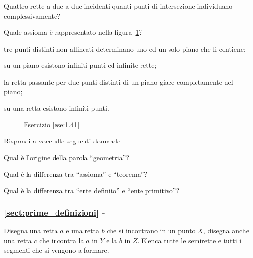 \begin{esercizio}
\label{ese:1.40}
Quattro rette a due a due incidenti quanti punti di intersezione 
individuano complessivamente?
\end{esercizio}

\begin{esercizio}
\label{ese:1.41}
Quale assioma è rappresentato nella figura~\ref{fig:ese1.41}?
\begin{enumeratea}
\item tre punti distinti non allineati determinano uno ed un solo 
piano che li contiene;
\item su un piano esistono infiniti punti ed infinite rette;
\item la retta passante per due punti distinti di un piano giace 
completamente nel piano;
\item su una retta esistono infiniti punti.
\end{enumeratea}
\end{esercizio}


\begin{inaccessibleblock}
 \begin{figure}[htb]
 \centering
 \caption{Esercizio \ref{ese:1.41}}\label{fig:ese1.41}
\end{figure}
\end{inaccessibleblock}

\begin{esercizio}
\label{ese:1.42}
Rispondi a voce alle seguenti domande
\begin{enumeratea}
\item Qual è l'origine della parola ``geometria''?
\item Qual è la differenza tra ``assioma'' e ``teorema''?
\item Qual è la differenza tra ``ente definito'' e ``ente primitivo''?
\end{enumeratea}
\end{esercizio}

\begingroup
\hypersetup{linkcolor=black}
\subsubsection*{\ref{sect:prime_definizioni} - 
}
\endgroup

\begin{esercizio}
\label{ese:1.43}
Disegna una retta $a$ e una retta $b$ che si incontrano in un punto 
$X$, disegna anche una retta $c$ che incontra la $a$ in $Y$ e la $b$ 
in $Z$. Elenca tutte le semirette e tutti i segmenti che si vengono a 
formare.
\end{esercizio}

